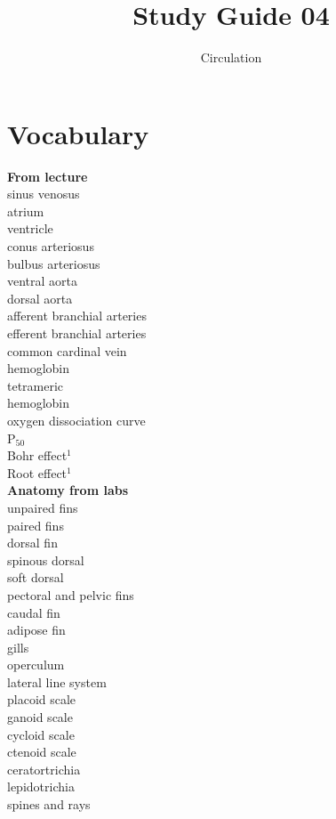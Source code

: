 \documentclass[nofonts, letterpaper]{tufte-handout}
\title{Study Guide 04}
\author{Circulation}
\date{} %
\begin{document}
\maketitle	%


\section{Vocabulary} 
\vspace{-1\baselineskip}
\begin{multicols}{2}
\textbf{From lecture} \\
sinus venosus \\
atrium \\
ventricle \\
conus arteriosus \\
bulbus arteriosus \\
ventral aorta \\
dorsal aorta \\
afferent branchial arteries \\
efferent branchial arteries \\
common cardinal vein \\
hemoglobin \\
tetrameric \\ \hspace{2ex}hemoglobin \\
oxygen dissociation curve \\
P$_{50}$ \\
Bohr effect$^1$ \\
Root effect$^1$ \\
\columnbreak\textbf{Anatomy from labs}\\
unpaired fins \\
paired fins \\
dorsal fin \\
spinous dorsal \\
soft dorsal \\
pectoral and pelvic fins \\
caudal fin \\
adipose fin \\
gills \\
operculum \\
lateral line system \\
placoid scale \\
ganoid scale \\
cycloid scale \\
ctenoid scale \\
ceratortrichia \\
lepidotrichia \\
spines and rays
\end{multicols}
\end{document}
